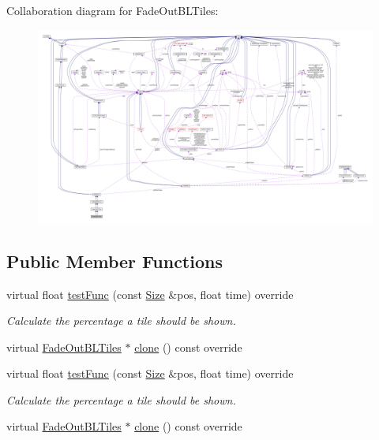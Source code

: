 Collaboration diagram for Fade\+Out\+B\+L\+Tiles\+:
\nopagebreak
\begin{figure}[H]
\begin{center}
\leavevmode
\includegraphics[width=350pt]{classFadeOutBLTiles__coll__graph}
\end{center}
\end{figure}
\subsection*{Public Member Functions}
\begin{DoxyCompactItemize}
\item 
virtual float \hyperlink{classFadeOutBLTiles_a00586757931bcc6166dc5052b0ef2633}{test\+Func} (const \hyperlink{classSize}{Size} \&pos, float time) override
\begin{DoxyCompactList}\small\item\em Calculate the percentage a tile should be shown. \end{DoxyCompactList}\item 
virtual \hyperlink{classFadeOutBLTiles}{Fade\+Out\+B\+L\+Tiles} $\ast$ \hyperlink{classFadeOutBLTiles_a09ddf5d56bdc979d963430286d50792b}{clone} () const override
\item 
virtual float \hyperlink{classFadeOutBLTiles_a17aa884f96bbdc18e8500bfb5bf68257}{test\+Func} (const \hyperlink{classSize}{Size} \&pos, float time) override
\begin{DoxyCompactList}\small\item\em Calculate the percentage a tile should be shown. \end{DoxyCompactList}\item 
virtual \hyperlink{classFadeOutBLTiles}{Fade\+Out\+B\+L\+Tiles} $\ast$ \hyperlink{classFadeOutBLTiles_ac52607f48d2a78ac604e4064bf72acec}{clone} () const override
\end{DoxyCompactItemize}
